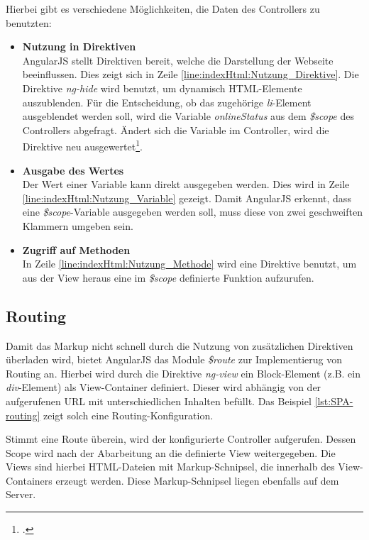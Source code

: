 Hierbei gibt es verschiedene Möglichkeiten, die Daten des Controllers zu benutzten: 
\begin{itemize}
\item \textbf{Nutzung in Direktiven}\\
AngularJS stellt Direktiven bereit, welche die Darstellung der Webseite beeinflussen. Dies zeigt sich in Zeile \ref{line:indexHtml:Nutzung_Direktive}. Die Direktive \textit{ng-hide} wird benutzt, um dynamisch \ac{HTML}-Elemente auszublenden. Für die Entscheidung, ob das zugehörige \textit{li}-Element ausgeblendet werden soll, wird die Variable \textit{onlineStatus} aus dem \textit{\$scope} des Controllers abgefragt. Ändert sich die Variable im Controller, wird die Direktive neu ausgewertet\footcite{online:angular:diretive}.
\item \textbf{Ausgabe des Wertes}\\
Der Wert einer Variable kann direkt ausgegeben werden. Dies wird in Zeile \ref{line:indexHtml:Nutzung_Variable} gezeigt. Damit AngularJS erkennt, dass eine \textit{\$scope}-Variable ausgegeben werden soll, muss diese von zwei geschweiften Klammern umgeben sein.
\item \textbf{Zugriff auf Methoden}\\
In Zeile \ref{line:indexHtml:Nutzung_Methode} wird eine Direktive benutzt, um aus der View heraus eine im \textit{\$scope} definierte Funktion aufzurufen.
\end{itemize}
\subsection{Routing}
\label{ssec:SPA-Routing}
Damit das Markup nicht schnell durch die Nutzung von zusätzlichen Direktiven überladen wird, bietet AngularJS das Module \textit{\$route} zur Implementierug von Routing an. Hierbei wird durch die Direktive \textit{ng-view} ein Block-Element (z.B. ein \textit{div}-Element) als View-Container definiert. Dieser wird abhängig von der aufgerufenen URL mit unterschiedlichen Inhalten befüllt. Das Beispiel \ref{lst:SPA-routing} zeigt solch eine Routing-Konfiguration. 

Stimmt eine Route überein, wird der konfigurierte Controller aufgerufen. Dessen Scope wird nach der Abarbeitung an die definierte View weitergegeben. Die Views sind hierbei \ac{HTML}-Dateien mit \gls{Markup}-Schnipsel, die innerhalb des View-Containers erzeugt werden. Diese \gls{Markup}-Schnipsel liegen ebenfalls auf dem Server. 
